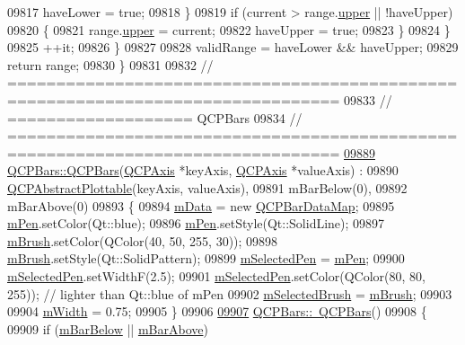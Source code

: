 \begin{DoxyCode}
09817         haveLower = \textcolor{keyword}{true};
09818       \}
09819       \textcolor{keywordflow}{if} (current > range.\hyperlink{a00049_ae44eb3aafe1d0e2ed34b499b6d2e074f}{upper} || !haveUpper)
09820       \{
09821         range.\hyperlink{a00049_ae44eb3aafe1d0e2ed34b499b6d2e074f}{upper} = current;
09822         haveUpper = \textcolor{keyword}{true};
09823       \}
09824     \}
09825     ++it;
09826   \}
09827   
09828   validRange = haveLower && haveUpper;
09829   \textcolor{keywordflow}{return} range;
09830 \}
09831 
09832 \textcolor{comment}{// ================================================================================}
09833 \textcolor{comment}{// =================== QCPBars}
09834 \textcolor{comment}{// ================================================================================}
\hypertarget{a00115_source_l09889}{}\hyperlink{a00027_a64006999ad9dff308f40df41cef176ad}{09889} \textcolor{comment}{}\hyperlink{a00027_a64006999ad9dff308f40df41cef176ad}{QCPBars::QCPBars}(\hyperlink{a00025}{QCPAxis} *keyAxis, \hyperlink{a00025}{QCPAxis} *valueAxis) :
09890   \hyperlink{a00024}{QCPAbstractPlottable}(keyAxis, valueAxis),
09891   mBarBelow(0),
09892   mBarAbove(0)
09893 \{
09894   \hyperlink{a00027_aef28d29d51ef84b608ecd22c55d531ff}{mData} = \textcolor{keyword}{new} \hyperlink{a00116_aa846c77472cae93def9f1609d0c57191}{QCPBarDataMap};
09895   \hyperlink{a00024_a67bc0622fd1b9fa14e54c14922dcec66}{mPen}.setColor(Qt::blue);
09896   \hyperlink{a00024_a67bc0622fd1b9fa14e54c14922dcec66}{mPen}.setStyle(Qt::SolidLine);
09897   \hyperlink{a00024_a33f00674c0161c13315ab9da0895418e}{mBrush}.setColor(QColor(40, 50, 255, 30));
09898   \hyperlink{a00024_a33f00674c0161c13315ab9da0895418e}{mBrush}.setStyle(Qt::SolidPattern);
09899   \hyperlink{a00024_a10619472f5d5e10e9519a599f1cf5576}{mSelectedPen} = \hyperlink{a00024_a67bc0622fd1b9fa14e54c14922dcec66}{mPen};
09900   \hyperlink{a00024_a10619472f5d5e10e9519a599f1cf5576}{mSelectedPen}.setWidthF(2.5);
09901   \hyperlink{a00024_a10619472f5d5e10e9519a599f1cf5576}{mSelectedPen}.setColor(QColor(80, 80, 255)); \textcolor{comment}{// lighter than Qt::blue of mPen}
09902   \hyperlink{a00024_aea3c0da30c7a8be23ad5f2d9bca36762}{mSelectedBrush} = \hyperlink{a00024_a33f00674c0161c13315ab9da0895418e}{mBrush};
09903   
09904   \hyperlink{a00027_a7c4e0f2246f8133f48a9c3f24cf5b920}{mWidth} = 0.75;
09905 \}
09906 
\hypertarget{a00115_source_l09907}{}\hyperlink{a00027_a4d880e28031ef120603f543379be2f22}{09907} \hyperlink{a00027_a4d880e28031ef120603f543379be2f22}{QCPBars::~QCPBars}()
09908 \{
09909   \textcolor{keywordflow}{if} (\hyperlink{a00027_a02eb7de7a2c03dc5699f329bb1c5f6e1}{mBarBelow} || \hyperlink{a00027_ade19776a2a6d393f15c0e27d4bb8e594}{mBarAbove})

\end{DoxyCode}
